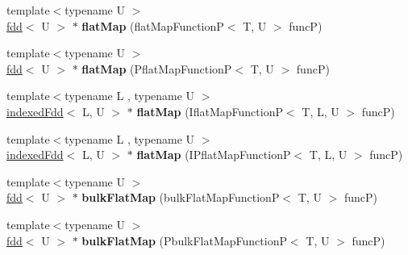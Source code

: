 \begin{DoxyCompactItemize}
\item 
\hypertarget{classfaster_1_1fdd_a7efd43be1d3005d654c4656d521faf30}{}{\footnotesize template$<$typename U $>$ }\\\hyperlink{classfaster_1_1fdd}{fdd}$<$ U $>$ $\ast$ {\bfseries flat\+Map} (flat\+Map\+Function\+P$<$ T, U $>$ func\+P)\label{classfaster_1_1fdd_a7efd43be1d3005d654c4656d521faf30}

\item 
\hypertarget{classfaster_1_1fdd_a3f353414307512c23d88fc3e8b2e8221}{}{\footnotesize template$<$typename U $>$ }\\\hyperlink{classfaster_1_1fdd}{fdd}$<$ U $>$ $\ast$ {\bfseries flat\+Map} (Pflat\+Map\+Function\+P$<$ T, U $>$ func\+P)\label{classfaster_1_1fdd_a3f353414307512c23d88fc3e8b2e8221}

\item 
\hypertarget{classfaster_1_1fdd_a499a1c3638cc1e95e483cd91c7a884a7}{}{\footnotesize template$<$typename L , typename U $>$ }\\\hyperlink{classfaster_1_1indexedFdd}{indexed\+Fdd}$<$ L, U $>$ $\ast$ {\bfseries flat\+Map} (Iflat\+Map\+Function\+P$<$ T, L, U $>$ func\+P)\label{classfaster_1_1fdd_a499a1c3638cc1e95e483cd91c7a884a7}

\item 
\hypertarget{classfaster_1_1fdd_ab1c639e6fe55d66ac0cb50011d537567}{}{\footnotesize template$<$typename L , typename U $>$ }\\\hyperlink{classfaster_1_1indexedFdd}{indexed\+Fdd}$<$ L, U $>$ $\ast$ {\bfseries flat\+Map} (I\+Pflat\+Map\+Function\+P$<$ T, L, U $>$ func\+P)\label{classfaster_1_1fdd_ab1c639e6fe55d66ac0cb50011d537567}

\item 
\hypertarget{classfaster_1_1fdd_a6f87b4e650b28ea32c363f6d902babb1}{}{\footnotesize template$<$typename U $>$ }\\\hyperlink{classfaster_1_1fdd}{fdd}$<$ U $>$ $\ast$ {\bfseries bulk\+Flat\+Map} (bulk\+Flat\+Map\+Function\+P$<$ T, U $>$ func\+P)\label{classfaster_1_1fdd_a6f87b4e650b28ea32c363f6d902babb1}

\item 
\hypertarget{classfaster_1_1fdd_a77058c1365a8696105acaf1468e8d3b4}{}{\footnotesize template$<$typename U $>$ }\\\hyperlink{classfaster_1_1fdd}{fdd}$<$ U $>$ $\ast$ {\bfseries bulk\+Flat\+Map} (Pbulk\+Flat\+Map\+Function\+P$<$ T, U $>$ func\+P)\label{classfaster_1_1fdd_a77058c1365a8696105acaf1468e8d3b4}


\end{DoxyCompactItemize}

